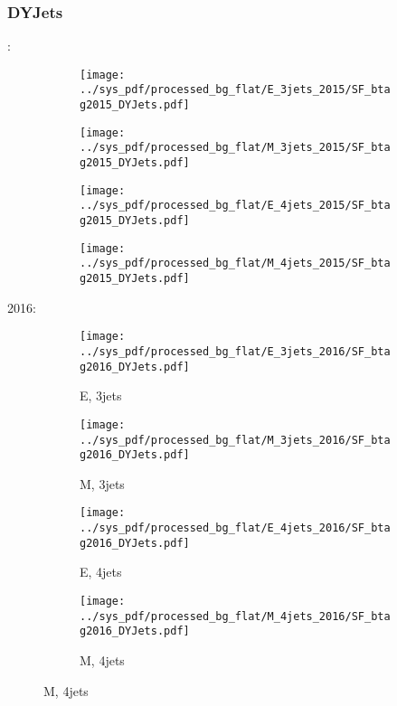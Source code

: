 \documentclass{beamer}
\begin{document}
\begin{frame}
\frametitle{DYJets}
\fontsize{5}{1}:
\begin{figure}
\centering
\begin{subfigure}[b]{0.24\textwidth}
\texttt{[image: ../sys\_pdf/processed\_bg\_flat/E\_3jets\_2015/SF\_btag2015\_DYJets.pdf]}
\end{subfigure}
\begin{subfigure}[b]{0.24\textwidth}
\texttt{[image: ../sys\_pdf/processed\_bg\_flat/M\_3jets\_2015/SF\_btag2015\_DYJets.pdf]}
\end{subfigure}
\begin{subfigure}[b]{0.24\textwidth}
\texttt{[image: ../sys\_pdf/processed\_bg\_flat/E\_4jets\_2015/SF\_btag2015\_DYJets.pdf]}
\end{subfigure}
\begin{subfigure}[b]{0.24\textwidth}
\texttt{[image: ../sys\_pdf/processed\_bg\_flat/M\_4jets\_2015/SF\_btag2015\_DYJets.pdf]}
\end{subfigure}
\end{figure}
2016:
\begin{figure}
\centering
\begin{subfigure}[b]{0.24\textwidth}
\texttt{[image: ../sys\_pdf/processed\_bg\_flat/E\_3jets\_2016/SF\_btag2016\_DYJets.pdf]}
\captionsetup{font=tiny}
\caption{E, 3jets}
\end{subfigure}
\begin{subfigure}[b]{0.24\textwidth}
\texttt{[image: ../sys\_pdf/processed\_bg\_flat/M\_3jets\_2016/SF\_btag2016\_DYJets.pdf]}
\captionsetup{font=tiny}
\caption{M, 3jets}
\end{subfigure}
\begin{subfigure}[b]{0.24\textwidth}
\texttt{[image: ../sys\_pdf/processed\_bg\_flat/E\_4jets\_2016/SF\_btag2016\_DYJets.pdf]}
\captionsetup{font=tiny}
\caption{E, 4jets}
\end{subfigure}
\begin{subfigure}[b]{0.24\textwidth}
\texttt{[image: ../sys\_pdf/processed\_bg\_flat/M\_4jets\_2016/SF\_btag2016\_DYJets.pdf]}
\captionsetup{font=tiny}
\caption{M, 4jets}
\end{subfigure}
\end{figure}
\end{frame}
\end{document}
